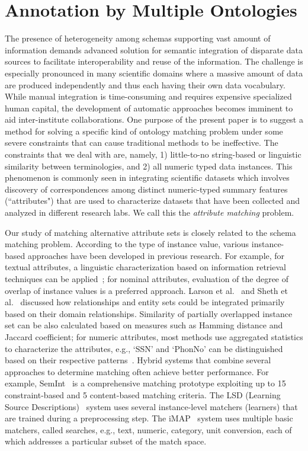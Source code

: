 \section{Annotation by Multiple Ontologies}
The presence of heterogeneity among schemas supporting vast amount of information demands advanced solution for semantic integration of disparate data sources to facilitate interoperability and reuse of the information. The challenge is especially pronounced in many scientific domains where a massive amount of data are produced independently and thus each having their own data vocabulary. While manual integration is time-consuming and requires expensive specialized human capital, the development of automatic approaches becomes imminent to aid inter-institute collaborations. One purpose of the present paper is to suggest a method for solving a specific kind of ontology matching problem under some severe constraints that can cause traditional methods to be ineffective. The constraints that we deal with are, namely, 1) little-to-no string-based or linguistic similarity between terminologies, and 2) all numeric typed data instances. This phenomenon is commonly seen in integrating scientific datasets which involves discovery of correspondences among distinct numeric-typed summary features (``attributes") that are used to characterize datasets that have been collected and analyzed in different research labs. We call this the \emph{attribute matching} problem.

Our study of matching alternative attribute sets is closely related to the schema matching problem. According to the type of instance value, various instance-based approaches have been developed in previous research. For example, for textual attributes, a linguistic characterization based on information retrieval techniques can be applied~\cite{Rahm01asurvey}; for nominal attributes, evaluation of the degree of overlap of instance values is a preferred approach. Larson et al.~\cite{Larson1989} and Sheth et al.~\cite{Sheth1988} discussed how relationships and entity sets could be integrated primarily based on their domain relationships. Similarity of partially overlapped instance set can be also calculated based on measures such as Hamming distance and Jaccard coefficient; for numeric attributes, most methods use aggregated statistics to characterize the attributes, e.g., `SSN' and `PhonNo' can be distinguished based on their respective patterns~\cite{Rahm01asurvey}. Hybrid systems that combine several approaches to determine matching often achieve better performance. For example, SemInt~\cite{Li00semint:a} is a comprehensive matching prototype exploiting up to 15 constraint-based and 5 content-based matching criteria. The LSD (Learning Source Descriptions)~\cite{Doan2000} system uses several instance-level matchers (learners) that are trained during a preprocessing step. The iMAP~\cite{Dhamankar04imap} system uses multiple basic matchers, called searches, e.g., text, numeric, category, unit conversion, each of which addresses a particular subset of the match space.

